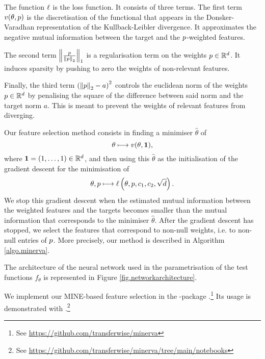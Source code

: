 The function $\lossfun$ is the loss function. 
It consists of three terms.
The first term 
$\donskervaradhanloss(\theta, \projection)$
is the discretisation of the functional that appears 
in the Donsker-Varadhan representation of 
the Kullback-Leibler divergence.
It approximates the negative mutual information 
between the target and the $\projection$-weighted features.

The second term 
$
\lonenorm[\frac{\projection}{\ltwonorm[\projection]}]
$
is a regularisation term on the
weights $\projection \in \Rd$.
It induces sparsity 
by pushing to zero the weights of non-relevant features.

Finally,
the third term
$
\left( \ltwonorm[\projection] - a \right)\squared
$
controls the euclidean norm of the 
weights $\projection \in \Rd$
by penalising the square of the difference between
said norm 
and
the target norm $a$.
This is meant
to prevent 
the weights of relevant features 
from diverging.


Our feature selection method
consists in
finding a minimiser 
$\hat{\theta}$ of 
\begin{equation*}
\theta \longmapsto \donskervaradhanloss(\theta, \ones),
\end{equation*}
where $\ones = (1, \dots, 1) \in \Rd$,
and then using this $\hat{\theta}$
as the initialisation of the gradient descent 
for the minimisation of 
\begin{equation*}
	\theta, \projection \longmapsto \lossfun\left(\theta, \projection, c_1, c_2, \sqrt{d}\right).
\end{equation*}
We stop this gradient descent 
when 
the estimated mutual information 
between 
the weighted features
and
the targets
becomes smaller than 
the mutual information 
that corresponds to the minimiser 
$\hat{\theta}$.
After the gradient descent has stopped,
we select the features that correspond to non-null weights,
i.e. to non-null entries of $\projection$.
More precisely, our method is described in Algorithm \ref{algo.minerva}.

The architecture 
of 
the neural network 
used in 
the parametrisation  of the test functions 
$f_\theta$
is represented in 
Figure
\ref{fig.networkarchitecture}.

We implement our MINE-based feature selection in the 
-package 
.\footnote{
	See
	\url{https://github.com/transferwise/minerva}
}
Its usage is demonstrated 
with 
.\footnote{
	See \url{https://github.com/transferwise/minerva/tree/main/notebooks}
}

